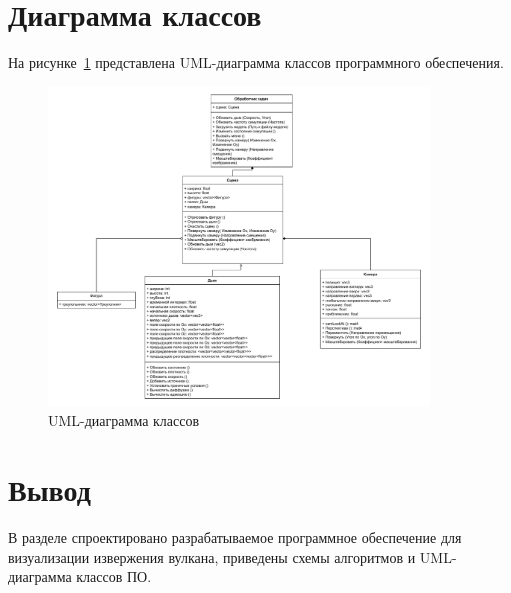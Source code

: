 \section{Диаграмма классов}

На рисунке~\ref{fig:uml} представлена UML-диаграмма классов программного обеспечения.

\begin{figure}[H]
	\centering
	\includegraphics[width=0.9\textwidth,page=1]{assets/img/smoke_uml.pdf}
	\caption{UML-диаграмма классов}
	\label{fig:uml}
\end{figure}

\section*{Вывод}
В разделе спроектировано разрабатываемое программное обеспечение для визуализации извержения вулкана, приведены схемы алгоритмов и UML-диаграмма классов ПО.
